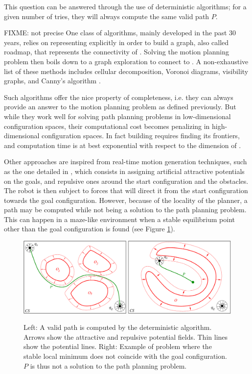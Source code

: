 This question can be answered through the use of deterministic
algorithms; for a given number of tries, they will always compute the
same valid path $P$.

FIXME: not precise
One class of algorithms, mainly developed in the past 30 years, relies
on representing {\cobs} explicitly in order to build a graph, also
called roadmap, that represents the connectivity of {\cfree}. Solving
the motion planning problem then boils down to a graph exploration to
connect  to . A non-exhaustive list of these
methods includes cellular decomposition, Voronoi diagrams, visibility
graphs, and Canny's algorithm \cite{good04}.

Such algorithms offer the nice property of completeness, i.e. they can
always provide an answer to the motion planning problem as defined
previously. But while they work well for solving path planning
problems in low-dimensional configuration spaces, their computational
cost becomes penalizing in high-dimensional configuration spaces. In
fact building {\cfree} requires finding its frontiers, and computation
time is at best exponential with respect to the dimension of
{\cspace}.

Other approaches are inspired from real-time motion generation
techniques, such as the one detailed in \cite{khat85}, which consists
in assigning artificial attractive potentials on the goals, and
repulsive ones around the start configuration and the obstacles. The
robot is then subject to forces that will direct it from the start
configuration towards the goal configuration. However, because of the
locality of the planner, a path may be computed while not being a
solution to the path planning problem. This can happen in a maze-like
environment when a stable equilibrium point other than the goal
configuration is found (see Figure
\ref{fig:chap1-deterministic-algorithm}).

\begin{figure}
  \centering
      {\includegraphics[width = \linewidth]
        {src/chap1-path-optimization/deterministic-algorithm.pdf}}
      \caption{Left: A valid path is computed by the deterministic
        algorithm. Arrows show the attractive and repulsive potential
        fields. Thin lines show the potential lines. Right: Example of
        problem where the stable local minimum does not coincide with
        the goal configuration. $P$ is thus not a solution to the path
        planning problem.}
      \label{fig:chap1-deterministic-algorithm}
\end{figure}

